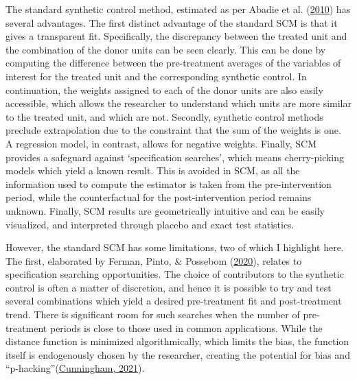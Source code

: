 \documentclass[12pt,nobind, a4paper]{reedthesis}
\begin{document}
 The standard synthetic control method, estimated as per Abadie et al. (\protect\hyperlink{ref-abadie_synthetic_2010}{2010}) has several advantages. The first distinct advantage of the standard SCM is that it gives a transparent fit. Specifically, the discrepancy between the treated unit and the combination of the donor units can be seen clearly. This can be done by computing the difference between the pre-treatment averages of the variables of interest for the treated unit and the corresponding synthetic control. In continuation, the weights assigned to each of the donor units are also easily accessible, which allows the researcher to understand which units are more similar to the treated unit, and which are not. Secondly, synthetic control methods preclude extrapolation due to the constraint that the sum of the weights is one. A regression model, in contrast, allows for negative weights. Finally, SCM provides a safeguard against `specification searches', which means cherry-picking models which yield a known result. This is avoided in SCM, as all the information used to compute the estimator is taken from the pre-intervention period, while the counterfactual for the post-intervention period remains unknown. Finally, SCM results are geometrically intuitive and can be easily visualized, and interpreted through placebo and exact test statistics.
 \linebreak

 However, the standard SCM has some limitations, two of which I highlight here. The first, elaborated by Ferman, Pinto, \& Possebom (\protect\hyperlink{ref-ferman_cherry_2020}{2020}), relates to specification searching opportunities. The choice of contributors to the synthetic control is often a matter of discretion, and hence it is possible to try and test several combinations which yield a desired pre-treatment fit and post-treatment trend. There is significant room for such searches when the number of pre-treatment periods is close to those used in common applications. While the distance function is minimized algorithmically, which limits the bias, the function itself is endogenously chosen by the researcher, creating the potential for bias and ``p-hacking''(\protect\hyperlink{ref-cunningham_causal_2021}{Cunningham, 2021}).
 \linebreak
\end{document}
